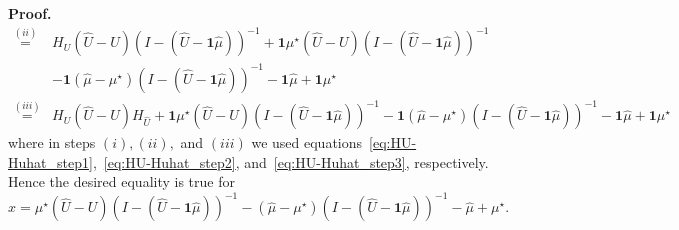 \documentclass[10pt,a4paper]{amsart}
\renewenvironment{proof}[1]{\par\medskip\noindent\textbf{#1}\enspace\ignorespaces}{\par\medskip}
\newcommand{\muhat}{\widehat{\mu}}
\newcommand{\one}{\mathbf{1}}
\newcommand{\uhat}{\widehat{U}}
\begin{document}
\begin{proof}{Proof.}
\begin{align*}
    \stackrel{(ii)}{=}& H_U  \left( \uhat - U \right) (I - (\uhat - \one \muhat))^{-1} + \one \mu^\star \left( \uhat - U \right) (I - (\uhat - \one \muhat))^{-1}  \\
    &- \one (\muhat - \mu^\star) (I - (\uhat - \one \muhat))^{-1}  - \one \muhat + \one \mu^\star \\
    \stackrel{(iii)}{=}& H_U  \left( \uhat - U \right) H_{\uhat} + \one \mu^\star \left( \uhat - U \right) (I - (\uhat - \one \muhat))^{-1}  - \one (\muhat - \mu^\star) (I - (\uhat - \one \muhat))^{-1}  - \one \muhat + \one \mu^\star
\end{align*}
where in steps $(i), (ii),$ and $(iii)$ we used equations~\eqref{eq:HU-Huhat_step1},~\eqref{eq:HU-Huhat_step2}, and~\eqref{eq:HU-Huhat_step3}, respectively. Hence the desired equality is true for
$
    x =  \mu^\star \left( \uhat - U \right) (I - (\uhat - \one \muhat))^{-1}  -  (\muhat - \mu^\star) (I - (\uhat - \one \muhat))^{-1}  -  \muhat +  \mu^\star.
$
\end{proof}
\end{document}
